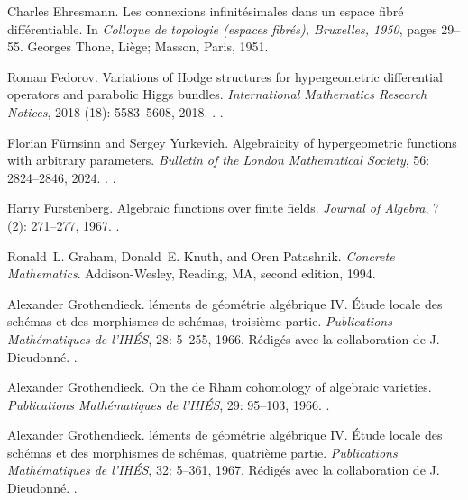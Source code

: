 \documentclass[11pt]{amsart}
\theoremstyle{definition}
\theoremstyle{remark}
\numberwithin{equation}{section}
\begin{document}
\begin{thebibliography}{99}
Charles Ehresmann.
\newblock Les connexions infinit{\'e}simales dans un espace fibr{\'e}
  diff{\'e}rentiable.
\newblock In \emph{Colloque de topologie (espaces fibr{\'e}s), Bruxelles,
  1950}, pages 29--55. Georges Thone, Li{\`e}ge; Masson, Paris, 1951.

Roman Fedorov.
\newblock Variations of {H}odge structures for hypergeometric differential
  operators and parabolic {H}iggs bundles.
\newblock \emph{International Mathematics Research Notices}, 2018
  (18): 5583--5608, 2018.
\newblock {}.
\newblock {}.

Florian F{\"u}rnsinn and Sergey Yurkevich.
\newblock Algebraicity of hypergeometric functions with arbitrary parameters.
\newblock \emph{Bulletin of the London Mathematical Society}, 56:
  2824--2846, 2024.
\newblock {}.
\newblock {}.

Harry Furstenberg.
\newblock Algebraic functions over finite fields.
\newblock \emph{Journal of Algebra}, 7 (2): 271--277, 1967.
\newblock {}.

Ronald~L. Graham, Donald~E. Knuth, and Oren Patashnik.
\newblock \emph{Concrete Mathematics}.
\newblock Addison-Wesley, Reading, MA, second edition, 1994.

Alexander Grothendieck.
l{\'e}ments de g{\'e}om{\'e}trie alg{\'e}brique {IV}.
  {{\'E}tude} locale des sch{\'e}mas et des morphismes de sch{\'e}mas,
  troisi{\`e}me partie.
\newblock \emph{Publications Math{\'e}matiques de l'IH{\'E}S}, 28:
  5--255, 1966{}.
\newblock R{\'e}dig{\'e}s avec la collaboration de J. Dieudonn{\'e}.
\newblock {}.

Alexander Grothendieck.
\newblock On the de {R}ham cohomology of algebraic varieties.
\newblock \emph{Publications Math{\'e}matiques de l'IH{\'E}S}, 29:
  95--103, 1966{}.
\newblock {}.

Alexander Grothendieck.
l{\'e}ments de g{\'e}om{\'e}trie alg{\'e}brique {IV}.
  {{\'E}tude} locale des sch{\'e}mas et des morphismes de sch{\'e}mas,
  quatri{\`e}me partie.
\newblock \emph{Publications Math{\'e}matiques de l'IH{\'E}S}, 32:
  5--361, 1967.
\newblock R{\'e}dig{\'e}s avec la collaboration de J. Dieudonn{\'e}.
\newblock {}.


\end{thebibliography}
\end{document}
